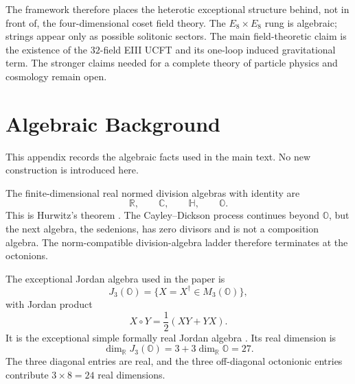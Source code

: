 \documentclass[aps,prd,preprint,longbibliography,nofootinbib,superscriptaddress,floatfix]{revtex4-2}
\begin{document}
The framework therefore places the heterotic exceptional structure behind, not
in front of, the four-dimensional coset field theory. The \(E_8\times E_8\)
rung is algebraic; strings appear only as possible solitonic sectors. The main
field-theoretic claim is the existence of the \(32\)-field EIII UCFT and its
one-loop induced gravitational term. The stronger claims needed for a complete
theory of particle physics and cosmology remain open.


\appendix

\section{Algebraic Background}
\label{app:algebraic_background}

This appendix records the algebraic facts used in the main text. No new
construction is introduced here.

The finite-dimensional real normed division algebras with identity are
\begin{equation}
    \mathbb R,\qquad
    \mathbb C,\qquad
    \mathbb H,\qquad
    \mathbb O .
    \label{eq:app_hurwitz_list}
\end{equation}
This is Hurwitz's theorem \cite{Hurwitz,BaezOctonions,SpringerVeldkamp}. The
Cayley--Dickson process continues beyond \(\mathbb O\), but the next algebra,
the sedenions, has zero divisors and is not a composition algebra. The
norm-compatible division-algebra ladder therefore terminates at the octonions.

The exceptional Jordan algebra used in the paper is
\begin{equation}
    J_3(\mathbb O)
    =
    \{X=X^\dagger\in M_3(\mathbb O)\},
    \label{eq:app_albert_definition}
\end{equation}
with Jordan product
\begin{equation}
    X\circ Y
    =
    \frac12(XY+YX).
    \label{eq:app_jordan_product}
\end{equation}
It is the exceptional simple formally real Jordan algebra
\cite{JordanVonNeumannWigner,SpringerVeldkamp,BaezOctonions}. Its real
dimension is
\begin{equation}
    \dim_{\mathbb R}J_3(\mathbb O)
    =
    3+3\dim_{\mathbb R}\mathbb O
    =
    27 .
    \label{eq:app_albert_dimension}
\end{equation}
The three diagonal entries are real, and the three off-diagonal octonionic
entries contribute \(3\times 8=24\) real dimensions.
\end{document}
